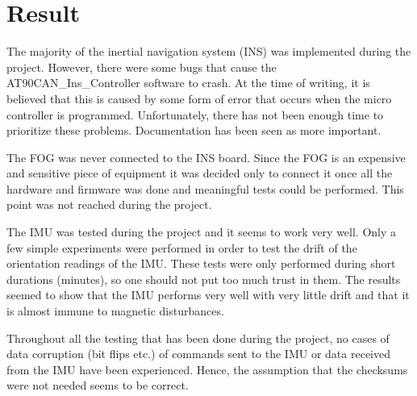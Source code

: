 
\section{Result}\label{sec:result}
The majority of the inertial navigation system (INS) was implemented during the project. However, there were some bugs that cause the AT90CAN\_Ins\_Controller software to crash. At the time of writing, it is believed that this is caused by some form of error that occurs when the micro controller is programmed. Unfortunately, there has not been enough time to prioritize these problems. Documentation has been seen as more important.

The FOG was never connected to the INS board. Since the FOG is an expensive and sensitive piece of equipment it was decided only to connect it once all the hardware and firmware was done and meaningful tests could be performed. This point was not reached during the project.

The IMU was tested during the project and it seems to work very well. Only a few simple experiments were performed in order to test the drift of the orientation readings of the IMU. These tests were only performed during short durations (minutes), so one should not put too much trust in them. The results seemed to show that the IMU performs very well with very little drift and that it is almost immune to magnetic disturbances.

Throughout all the testing that has been done during the project, no cases of data corruption (bit flips etc.) of commands sent to the IMU or data received from the IMU have been experienced. Hence, the assumption that the checksums were not needed seems to be correct.
